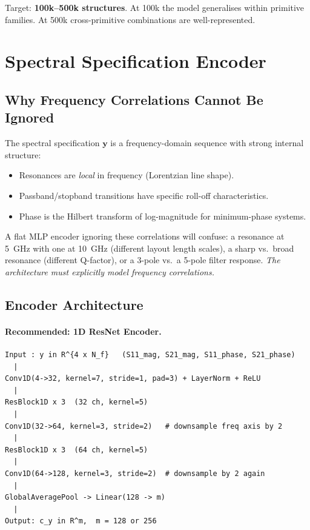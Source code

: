 \documentclass[12pt,a4paper]{article}
\theoremstyle{definition}
\theoremstyle{plain}
\theoremstyle{remark}
\begin{document}
Target: \textbf{100k--500k structures}.
At 100k the model generalises within primitive families.
At 500k cross-primitive combinations are well-represented.

\section{Spectral Specification Encoder}
\label{sec:encoder}

\subsection{Why Frequency Correlations Cannot Be Ignored}

The spectral specification $\mathbf{y}$ is a frequency-domain sequence with strong
internal structure:
\begin{itemize}
  \item Resonances are \emph{local} in frequency (Lorentzian line shape).
  \item Passband/stopband transitions have specific roll-off characteristics.
  \item Phase is the Hilbert transform of log-magnitude for minimum-phase systems.
\end{itemize}

A flat MLP encoder ignoring these correlations will confuse:
a resonance at 5~GHz with one at 10~GHz (different layout length scales),
a sharp vs.\ broad resonance (different Q-factor),
or a 3-pole vs.\ a 5-pole filter response.
\emph{The architecture must explicitly model frequency correlations.}

\subsection{Encoder Architecture}

\paragraph{Recommended: 1D ResNet Encoder.}

\begin{lstlisting}[caption={1D ResNet spectral encoder.}]
Input : y in R^{4 x N_f}   (S11_mag, S21_mag, S11_phase, S21_phase)
  |
Conv1D(4->32, kernel=7, stride=1, pad=3) + LayerNorm + ReLU
  |
ResBlock1D x 3  (32 ch, kernel=5)
  |
Conv1D(32->64, kernel=3, stride=2)   # downsample freq axis by 2
  |
ResBlock1D x 3  (64 ch, kernel=5)
  |
Conv1D(64->128, kernel=3, stride=2)  # downsample by 2 again
  |
GlobalAveragePool -> Linear(128 -> m)
  |
Output: c_y in R^m,  m = 128 or 256
\end{lstlisting}
\end{document}
